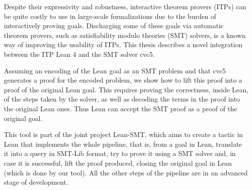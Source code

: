 Despite their expressivity and robustness, interactive theorem pro\-vers (ITPs)
can be quite costly to use in large-scale formalizations due to the burden of
interactively proving goals.
%
Discharging some of these goals via automatic theorem provers, such as
satisfiability modulo theories (SMT) solvers, is a known way of improving the
usability of ITPs.
%
This thesis describes a novel integration between the ITP
Lean 4 and the SMT solver cvc5.

Assuming an encoding of the Lean goal as an SMT problem and that cvc5
generates a proof for the encoded problem, we show how to lift this proof into
a proof of the original Lean goal.
%
This requires proving the correctness, inside Lean, of the steps taken by the
solver, as well as decoding the terms in the proof into the original Lean
ones. Thus Lean can accept the SMT proof as a proof of the original goal.

This tool is part of the joint project Lean-SMT, which aims to create a
tactic in Lean that implements the whole pipeline, that is, from a goal in
Lean, translate it into a query in SMT-Lib format, try to prove it using
a SMT solver and, in case it is successful, lift the proof produced,
closing the original goal in Lean (which is done by our tool).
%
All the other steps of the pipeline are in an advanced stage of development.
